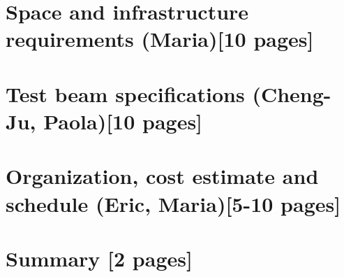 \documentclass[12pt]{article}
\begin{document}
\section{Space and infrastructure requirements {\color{red} (Maria)[10 pages]}}


\section{Test beam specifications {\color{red} (Cheng-Ju, Paola)[10 pages]}} 


\section{Organization, cost estimate and schedule {\color{red} (Eric, Maria)[5-10 pages]}}



%
% 


\newpage
\section{Summary {\color{red}[2 pages]}}


\newpage



% 
\end{document}
